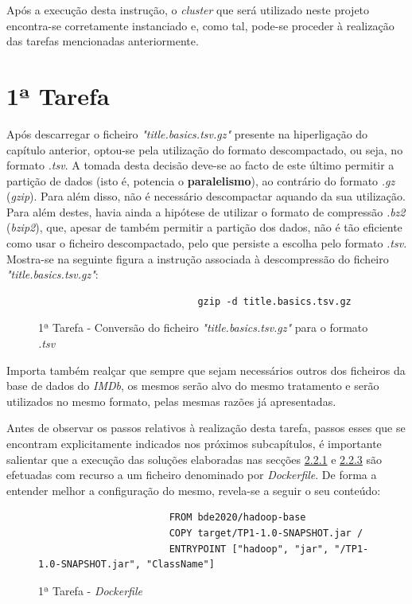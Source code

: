 \documentclass[a4paper]{report}
\begin{document}
{		Após a execução desta instrução, o \textit{cluster} que será utilizado neste projeto encontra-se corretamente instanciado e, como tal, pode-se proceder à realização das tarefas mencionadas anteriormente.

	\section{1ª Tarefa} \label{sec:Task1}
		Após descarregar o ficheiro \textit{"title.basics.tsv.gz"} presente na hiperligação do capítulo anterior, optou-se pela utilização do formato descompactado, ou seja, no formato \textit{.tsv}.
		A tomada desta decisão deve-se ao facto de este último permitir a partição de dados (isto é, potencia o \textbf{paralelismo}), ao contrário do formato \textit{.gz} (\textit{gzip}). Para além disso, não é necessário descompactar aquando da sua utilização. 
		Para além destes, havia ainda a hipótese de utilizar o formato de compressão \textit{.bz2} (\textit{bzip2}), que, apesar de também permitir a partição dos dados, não é tão eficiente como usar o ficheiro descompactado, pelo que persiste a escolha pelo formato \textit{.tsv}.
		Mostra-se na seguinte figura a instrução associada à descompressão do ficheiro \textit{"title.basics.tsv.gz"}:
		\begin{figure}[H]
			{
				\color{teal}
				\begin{verbatim}
                            gzip -d title.basics.tsv.gz
				\end{verbatim}
			}
			\caption{1ª Tarefa - Conversão do ficheiro \textit{"title.basics.tsv.gz"} para o formato \textit{.tsv}}
            \label{fig:2}
		\end{figure}

		Importa também realçar que sempre que sejam necessários outros dos ficheiros da base de dados do \textit{IMDb}, os mesmos serão alvo do mesmo tratamento e serão utilizados no mesmo formato, pelas mesmas razões já apresentadas.

		Antes de observar os passos relativos à realização desta tarefa, passos esses que se encontram explicitamente indicados nos próximos subcapítulos, é importante salientar que a execução das soluções elaboradas nas secções \hyperref[subsec:Task1-1]{2.2.1} e \hyperref[subsec:Task1-3]{2.2.3} são efetuadas com recurso a um ficheiro denominado por \textit{Dockerfile}.
		De forma a entender melhor a configuração do mesmo, revela-se a seguir o seu conteúdo:
		\begin{figure}[H]
			{
				\color{teal}
				\begin{verbatim}
					   FROM bde2020/hadoop-base
					   COPY target/TP1-1.0-SNAPSHOT.jar /
					   ENTRYPOINT ["hadoop", "jar", "/TP1-1.0-SNAPSHOT.jar", "ClassName"]
				\end{verbatim}
			}
            \caption{1ª Tarefa - \textit{Dockerfile}}
            \label{fig:3}
        \end{figure}
        
}
\end{document}
